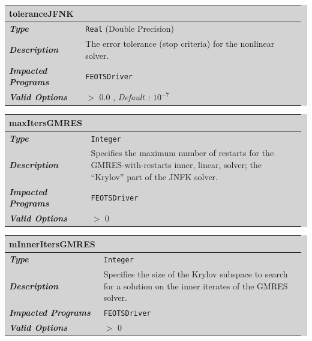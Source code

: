 \documentclass{softwaremanual}
\begin{document}
\noindent\begingroup\setlength{\fboxsep}{0pt}
\colorbox{lightgray}{
\begin{tabular}{p{0.25\linewidth} p{0.725\linewidth}}
\toprule
\textbf{toleranceJFNK} & \\
\midrule
\textbf{\textit{Type}} & \texttt{Real} (Double Precision) \\
\midrule
\textbf{\textit{Description}} & The error tolerance (stop criteria) for the nonlinear solver. \\
\midrule
\textbf{\textit{Impacted Programs}} & \texttt{FEOTSDriver} \\
\midrule
\textbf{\textit{Valid Options}}  & $>$ 0.0 , \textit{Default :} $10^{-7}$\\
\bottomrule
\end{tabular}
}\endgroup

\noindent\begingroup\setlength{\fboxsep}{0pt}
\colorbox{lightgray}{
\begin{tabular}{p{0.25\linewidth} p{0.725\linewidth}}
\toprule
\textbf{maxItersGMRES} & \\
\midrule
\textbf{\textit{Type}} & \texttt{Integer} \\
\midrule
\textbf{\textit{Description}} & Specifies the maximum number of restarts for the GMRES-with-restarts inner, linear, solver; the ``Krylov'' part of the JNFK solver. \\
\midrule
\textbf{\textit{Impacted Programs}} & \texttt{FEOTSDriver} \\
\midrule
\textbf{\textit{Valid Options}}  & $>$ 0\\
\bottomrule
\end{tabular}
}\endgroup

\noindent\begingroup\setlength{\fboxsep}{0pt}
\colorbox{lightgray}{
\begin{tabular}{p{0.25\linewidth} p{0.725\linewidth}}
\toprule
\textbf{mInnerItersGMRES} & \\
\midrule
\textbf{\textit{Type}} & \texttt{Integer} \\
\midrule
\textbf{\textit{Description}} & Specifies the size of the Krylov subspace to search for a solution on the inner iterates of the GMRES solver. \\
\midrule
\textbf{\textit{Impacted Programs}} & \texttt{FEOTSDriver} \\
\midrule
\textbf{\textit{Valid Options}}  & $>$ 0\\
\bottomrule
\end{tabular}
}\endgroup
\end{document}
